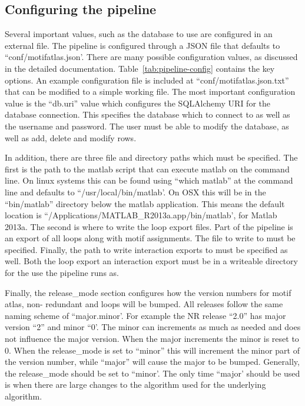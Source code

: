 \subsection{Configuring the pipeline}

Several important values, such as the database to use are configured in an
external file. The pipeline is configured through a JSON file that defaults to
``conf/motifatlas.json'. There are many possible configuration values, as
discussed in the detailed documentation. Table~\ref{tab:pipeline-config}
contains the key options. An example configuration file is included at
``conf/motifatlas.json.txt'' that can be modified to a simple working file. The
most important configuration value is the ``db.uri'' value which configures the
SQLAlchemy URI for the database connection. This specifies the database which to
connect to as well as the username and password. The user must be able to modify
the database, as well as add, delete and modify rows.

In addition, there are three file and directory paths which must be specified.
The first is the path to the matlab script that can execute matlab on the
command line. On linux systems this can be found using ``which matlab'' at the
command line and defaults to ``/usr/local/bin/matlab'. On OSX this will be in the
``bin/matlab'' directory below the matlab application. This means the default
location is ``/Applications/MATLAB\_R2013a.app/bin/matlab', for Matlab 2013a. The
second is where to write the loop export files. Part of the pipeline is an
export of all loops along with motif assignments. The file to write to must be
specified. Finally, the path to write interaction exports to must be specified
as well. Both the loop export an interaction export must be in a writeable
directory for the use the pipeline runs as.

Finally, the release\_mode section configures how the version numbers for motif
atlas, non- redundant and loops will be bumped. All releases follow the same
naming scheme of ``major.minor'. For example the NR release ``2.0'' has major
version ``2'' and minor ``0'. The minor can increments as much as needed and does
not influence the major version. When the major increments the minor is reset to
0. When the release\_mode is set to ``minor'' this will increment the minor part
of the version number, while ``major'' will cause the major to be bumped.
Generally, the release\_mode should be set to ``minor'. The only time ``major'
should be used is when there are large changes to the algorithm used for the
underlying algorithm.

